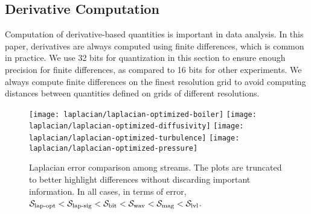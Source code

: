 \subsection{Derivative Computation} \label{sec:derivatives}

Computation of derivative-based quantities is important in data analysis. In this paper, derivatives
are always computed using finite differences, which is common in practice. We use 32 bits for
quantization in this section to ensure enough precision for finite differences, as compared to 16
bits for other experiments. We always compute finite differences on the finest resolution grid to
avoid computing distances between quantities defined on grids of different resolutions.

\begin{figure*}[h]
\centering
{}
{\texttt{[image: laplacian/laplacian-optimized-boiler]}}
{\texttt{[image: laplacian/laplacian-optimized-diffusivity]}}
{\texttt{[image: laplacian/laplacian-optimized-turbulence]}}
{\texttt{[image: laplacian/laplacian-optimized-pressure]}}
\caption{Laplacian error comparison among streams. The plots are truncated to better highlight
differences without discarding important information. In all cases, in terms of error, $\slop <
\slsg < \sbit < \swav < \smag < \slvl$.}
\label{fig:laplacian-error-comparison}
\end{figure*}

